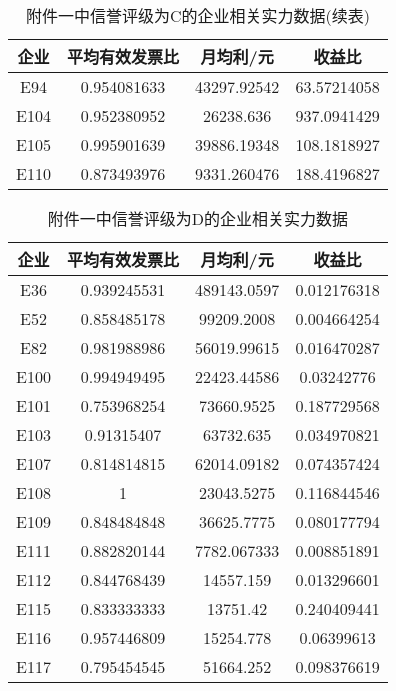 \documentclass{cumcmthesis}
\begin{document}
\begin{appendices}
\begin{table}[H]   %
	\caption{附件一中信誉评级为C的企业相关实力数据(续表)}\label{tab:009} \centering
	\begin{tabular}{cccc}
		\toprule[1.5pt]
		企业 & 平均有效发票比     & 月均利/元           & 收益比          \\
		\midrule[1pt]
E94  & 0.954081633 & 43297.92542 & 63.57214058  \\
E104 & 0.952380952 & 26238.636   & 937.0941429  \\
E105 & 0.995901639 & 39886.19348 & 108.1818927  \\
E110 & 0.873493976 & 9331.260476 & 188.4196827 \\
		\bottomrule[1.5pt]
\end{tabular}
\end{table}

\begin{table}[H]   %
	\caption{附件一中信誉评级为D的企业相关实力数据}\label{tab:005} \centering
	\begin{tabular}{cccc}
		\toprule[1.5pt]
		企业 & 平均有效发票比     & 月均利/元           & 收益比          \\
		\midrule[1pt]
E36  & 0.939245531 & 489143.0597  & 0.012176318  \\
E52  & 0.858485178 & 99209.2008   & 0.004664254  \\
E82  & 0.981988986 & 56019.99615  & 0.016470287  \\
E100 & 0.994949495 & 22423.44586  & 0.03242776   \\
E101 & 0.753968254 & 73660.9525   & 0.187729568  \\
E103 & 0.91315407  & 63732.635    & 0.034970821  \\
E107 & 0.814814815 & 62014.09182  & 0.074357424  \\
E108 & 1           & 23043.5275   & 0.116844546  \\
E109 & 0.848484848 & 36625.7775   & 0.080177794  \\
E111 & 0.882820144 & 7782.067333  & 0.008851891  \\
E112 & 0.844768439 & 14557.159    & 0.013296601  \\
E115 & 0.833333333 & 13751.42     & 0.240409441  \\
E116 & 0.957446809 & 15254.778    & 0.06399613   \\
E117 & 0.795454545 & 51664.252    & 0.098376619  \\
		\bottomrule[1.5pt]
\end{tabular}
\end{table}


\end{appendices}
\end{document}
